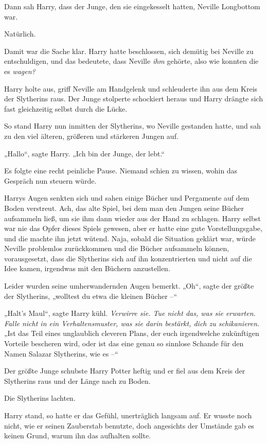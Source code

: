 {Dann sah Harry, dass der Junge, den sie eingekesselt hatten, Neville Longbottom war.

Natürlich.

Damit war die Sache klar. Harry hatte beschlossen, sich demütig bei Neville zu entschuldigen, und das bedeutete, dass Neville \emph{ihm} gehörte, also wie konnten die es \emph{wagen?}

Harry holte aus, griff Neville am Handgelenk und schleuderte ihn aus dem Kreis der Slytherins raus. Der Junge stolperte schockiert heraus und Harry drängte sich fast gleichzeitig selbst durch die Lücke.

So stand Harry nun inmitten der Slytherins, wo Neville gestanden hatte, und sah zu den viel älteren, größeren und stärkeren Jungen auf.

„Hallo“, sagte Harry. „Ich bin der Junge, der lebt.“

Es folgte eine recht peinliche Pause. Niemand schien zu wissen, wohin das Gespräch nun steuern würde.

Harrys Augen senkten sich und sahen einige Bücher und Pergamente auf dem Boden verstreut. Ach, das alte Spiel, bei dem man den Jungen seine Bücher aufsammeln ließ, um sie ihm dann wieder aus der Hand zu schlagen. Harry selbst war nie das Opfer dieses Spiels gewesen, aber er hatte eine gute Vorstellungsgabe, und die machte ihn jetzt wütend. Naja, sobald die Situation geklärt war, würde Neville problemlos zurückkommen und die Bücher aufsammeln können, vorausgesetzt, dass die Slytherins sich auf ihn konzentrierten und nicht auf die Idee kamen, irgendwas mit den Büchern anzustellen.

Leider wurden seine umherwandernden Augen bemerkt. „Oh“, sagte der größte der Slytherins, „wolltest du etwa die kleinen Bücher --“

„Halt's Maul“, sagte Harry kühl. \emph{Verwirre sie. Tue nicht das, was sie erwarten. Falle nicht in ein Verhaltensmuster, was sie darin bestärkt, dich zu schikanieren.} „Ist das Teil eines unglaublich cleveren Plans, der euch irgendwelche zukünftigen Vorteile bescheren wird, oder ist das eine genau so sinnlose Schande für den Namen Salazar Slytherins, wie es --“

Der größte Junge schubste Harry Potter heftig und er fiel aus dem Kreis der Slytherins raus und der Länge nach zu Boden.

Die Slytherins lachten.

Harry stand, so hatte er das Gefühl, unerträglich langsam auf. Er wusste noch nicht, wie er seinen Zauberstab benutzte, doch angesichts der Umstände gab es keinen Grund, warum ihn das aufhalten sollte.

}
